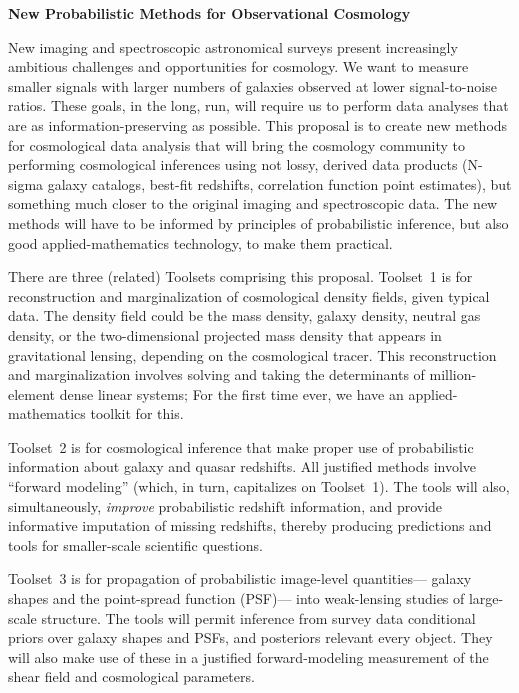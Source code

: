 \documentclass[12pt]{article}
\begin{document}
\sloppy\sloppypar\thispagestyle{empty}

\noindent
\textbf{New Probabilistic Methods for Observational Cosmology} %
\smallskip

New imaging and spectroscopic astronomical surveys present
increasingly ambitious challenges and opportunities for cosmology.
We want to measure smaller signals with larger numbers of galaxies
observed at lower signal-to-noise ratios.
These goals, in the long, run, will require us to perform data
analyses that are as information-preserving as possible.
This proposal is to create new methods for cosmological data analysis
that will bring the cosmology community to performing cosmological
inferences using not lossy, derived data products (N-sigma galaxy
catalogs, best-fit redshifts, correlation function point estimates),
but something much closer to the original imaging and spectroscopic
data.
The new methods will have to be informed by principles of
probabilistic inference, but also good applied-mathematics technology,
to make them practical.

There are three (related) Toolsets comprising this proposal.
Toolset~1 is for reconstruction and marginalization
of cosmological density fields, given typical data.
The density field could be the mass density, galaxy density,
neutral gas density, or the two-dimensional projected mass density
that appears in gravitational lensing, depending on the cosmological tracer.
This reconstruction and marginalization involves solving and taking
the determinants of million-element dense linear systems;
For the first time ever, we have an applied-mathematics toolkit for this.

Toolset~2 is for cosmological inference that make proper
use of probabilistic information about galaxy and quasar redshifts.
All justified methods involve ``forward modeling'' (which, in turn,
capitalizes on Toolset~1).  The tools will also, simultaneously,
\emph{improve} probabilistic redshift information, and provide
informative imputation of missing redshifts, thereby producing
predictions and tools for smaller-scale scientific questions.

Toolset~3 is for propagation of probabilistic image-level quantities---%
galaxy shapes and the point-spread function (PSF)---%
into weak-lensing studies of large-scale structure.
The tools will permit inference from survey data conditional priors over
galaxy shapes and PSFs, and posteriors relevant every object.
They will also make use of these in a justified forward-modeling
measurement of the shear field and cosmological parameters.
\end{document}
